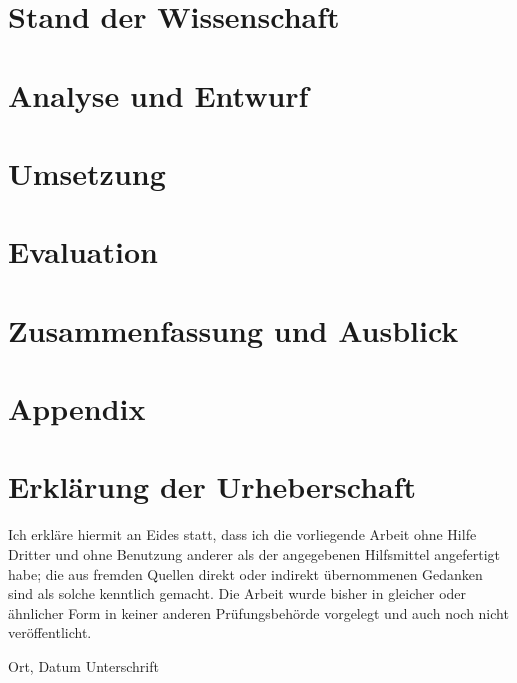 \documentclass[
	12pt,
	BCOR=10mm,
	listof=totoc,
	bibliography=totoc
	]
{scrbook} %
\begin{document}
\chapter{Stand der Wissenschaft}
\label{ch:state-art}
 	

\chapter{Analyse und Entwurf}
\label{ch:probs-obs-procs}
 	
 	
\chapter{Umsetzung}
\label{ch:realisation}
 	

 	
\chapter{Evaluation}
\label{ch:summ-eva-outl}
 	
 	
\chapter{Zusammenfassung und Ausblick}
\label{ch:summ-eva-outl}
 	


\twocolumn 


\onecolumn
\appendix 	
\chapter{Appendix}
\label{ch:appendix}
 	 
 	
\chapter*{Erklärung der Urheberschaft}

Ich erkläre hiermit an Eides statt, dass ich die vorliegende Arbeit
ohne Hilfe Dritter und ohne Benutzung anderer als der angegebenen
Hilfsmittel angefertigt habe; die aus fremden Quellen direkt oder
indirekt übernommenen Gedanken sind als solche kenntlich gemacht. Die
Arbeit wurde bisher in gleicher oder ähnlicher Form in keiner anderen
Prüfungsbehörde vorgelegt und auch noch nicht veröffentlicht.


\vspace{4cm}

\hspace{2cm} Ort, Datum \hfill Unterschrift \hspace{2cm}
\end{document}
